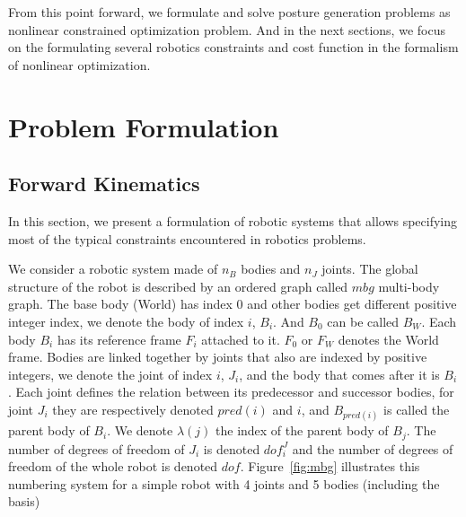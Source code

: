 From this point forward, we formulate and solve posture generation problems as nonlinear constrained optimization problem. And in the next sections, we focus on the formulating several robotics constraints and cost function in the formalism of nonlinear optimization.


\section{Problem Formulation}
\label{sec:pg_formulation}


\subsection{Forward Kinematics}
\label{sub:forward_kinematics}


In this section, we present a formulation of robotic systems that allows specifying most of the typical constraints encountered in robotics problems.

We consider a robotic system made of $n_B$ bodies and $n_J$ joints.
The global structure of the robot is described by an ordered graph called $mbg$ multi-body graph.
The base body (World) has index $0$ and other bodies get different positive integer index, we denote the body of index $i$, $B_i$. And $B_0$ can be called $B_W$.
Each body $B_i$ has its reference frame $F_i$ attached to it.
$F_0$ or $F_W$ denotes the World frame.
Bodies are linked together by joints that also are indexed by positive integers, we denote the joint of index $i$, $J_i$, and the body that comes after it is $B_i$.
Each joint defines the relation between its predecessor and successor bodies, for joint $J_i$ they are respectively denoted $pred(i)$ and $i$, and $B_{pred(i)}$ is called the parent body of $B_{i}$.
We denote $\lambda(j)$ the index of the parent body of $B_j$.
The number of degrees of freedom of $J_i$ is denoted $dof^J_i$ and the number of degrees of freedom of the whole robot is denoted $dof$.
Figure~\ref{fig:mbg} illustrates this numbering system for a simple robot with 4 joints and 5 bodies (including the basis)

